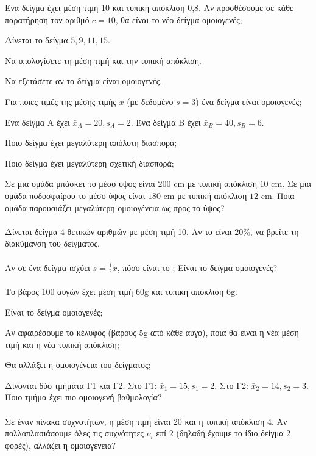 \documentclass[11pt,a4paper,modern]{FFExercises}
\begin{document}
\askhsh
Ένα δείγμα έχει μέση τιμή 10 και τυπική απόκλιση 0,8. Αν προσθέσουμε σε κάθε παρατήρηση τον αριθμό $c=10$, θα είναι το νέο δείγμα ομοιογενές;

\askhsh
Δίνεται το δείγμα $5, 9, 11, 15$.
\begin{alist}
    \item Να υπολογίσετε τη μέση τιμή και την τυπική απόκλιση.
    \item Να εξετάσετε αν το δείγμα είναι ομοιογενές.
\end{alist}

\askhsh
Για ποιες τιμές της μέσης τιμής $\bar{x}$ (με δεδομένο $s=3$) ένα δείγμα είναι ομοιογενές;

\askhsh
Ένα δείγμα Α έχει $\bar{x}_A = 20, s_A = 2$. Ένα δείγμα Β έχει $\bar{x}_B = 40, s_B = 6$.
\begin{alist}
    \item Ποιο δείγμα έχει μεγαλύτερη απόλυτη διασπορά;
    \item Ποιο δείγμα έχει μεγαλύτερη σχετική διασπορά;
\end{alist}

\askhsh
Σε μια ομάδα μπάσκετ το μέσο ύψος είναι $200$ \si{cm} με τυπική απόκλιση $10$ \si{cm}. Σε μια ομάδα ποδοσφαίρου το μέσο ύψος είναι $180$ \si{cm} με τυπική απόκλιση $12$ \si{cm}. Ποια ομάδα παρουσιάζει μεγαλύτερη ομοιογένεια ως προς το ύψος?\\\\
\askhsh
Δίνεται δείγμα 4 θετικών αριθμών με μέση τιμή 10. Αν το  είναι $20\%$, να βρείτε τη διακύμανση του δείγματος.\\\\
\askhsh
Αν σε ένα δείγμα ισχύει $s = \frac{1}{2} \bar{x}$, πόσο είναι το ; Είναι το δείγμα ομοιογενές?\\\\
\askhsh
Το βάρος 100 αυγών έχει μέση τιμή 60\si{g} και τυπική απόκλιση 6\si{g}.
\begin{alist}
    \item Είναι το δείγμα ομοιογενές;
    \item Αν αφαιρέσουμε το κέλυφος (βάρους 5\si{g} από κάθε αυγό), ποια θα είναι η νέα μέση τιμή και η νέα τυπική απόκλιση;
    \item Θα αλλάξει η ομοιογένεια του δείγματος;
\end{alist}

\askhsh
Δίνονται δύο τμήματα Γ1 και Γ2.
Στο Γ1: $\bar{x}_1 = 15, s_1 = 2$.
Στο Γ2: $\bar{x}_2 = 14, s_2 = 3$.
Ποιο τμήμα έχει πιο ομοιογενή βαθμολογία?\\\\
\askhsh
Σε έναν πίνακα συχνοτήτων, η μέση τιμή είναι 20 και η τυπική απόκλιση 4.
Αν πολλαπλασιάσουμε όλες τις συχνότητες $\nu_i$ επί 2 (δηλαδή έχουμε το ίδιο δείγμα 2 φορές), αλλάζει η ομοιογένεια?\\\\
\end{document}
